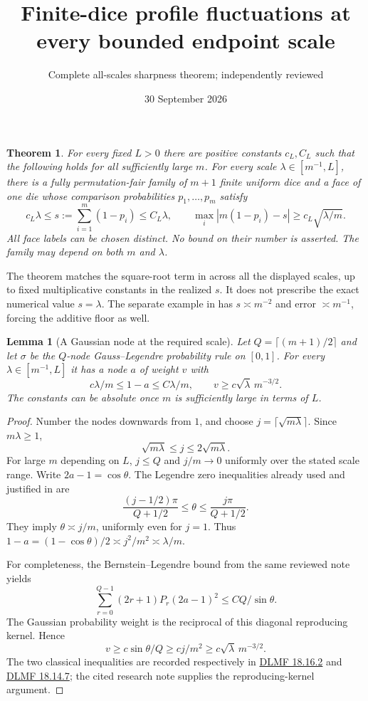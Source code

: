 \documentclass[11pt]{article}
\title{Finite-dice profile fluctuations at every bounded endpoint scale}
\author{Complete all-scales sharpness theorem; independently reviewed}
\date{30 September 2026}
\newtheorem{theorem}{Theorem}\newtheorem{lemma}{Lemma}
\begin{document}
\maketitle

\begin{theorem}\label{main}
For every fixed $L>0$ there are positive constants $c_L,C_L$ such
that the following holds for all sufficiently large $m$.
For every scale $\lambda\in[m^{-1},L]$, there is a fully
permutation-fair family of $m+1$ finite uniform dice and a face of
one die whose comparison probabilities $p_1,\ldots,p_m$ satisfy
\[
 c_L\lambda\le s:=\sum_{i=1}^m(1-p_i)\le C_L\lambda,
 \qquad
 \max_i|m(1-p_i)-s|\ge c_L\sqrt{\lambda/m}.
\]
All face labels can be chosen distinct. No bound on their number is
asserted. The family may depend on both $m$ and $\lambda$.
\end{theorem}

The theorem matches the square-root term in
 across all the displayed
scales, up to fixed multiplicative constants in the realized $s$.
It does not prescribe the exact numerical value $s=\lambda$.
The separate example in 
has $s\asymp m^{-2}$ and error $\asymp m^{-1}$, forcing the
additive floor as well.

\begin{lemma}[A Gaussian node at the required scale]\label{node}
Let $Q=\lceil(m+1)/2\rceil$ and let $\sigma$ be the $Q$-node
Gauss--Legendre probability rule on $[0,1]$. For every
$\lambda\in[m^{-1},L]$ it has a node $a$ of weight $v$ with
\[
 c\lambda/m\le1-a\le C\lambda/m,
 \qquad v\ge c\sqrt\lambda\,m^{-3/2}.
\]
The constants can be absolute once $m$ is sufficiently large in
terms of $L$.
\end{lemma}
\begin{proof}
Number the nodes downwards from $1$, and choose
$j=\lceil\sqrt{m\lambda}\rceil$. Since $m\lambda\ge1$,
\[
 \sqrt{m\lambda}\le j\le2\sqrt{m\lambda}.
\]
For large $m$ depending on $L$, $j\le Q$ and $j/m\to0$
uniformly over the stated scale range. Write $2a-1=\cos\theta$.
The Legendre zero inequalities already used and justified in
 are
\[
 \frac{(j-1/2)\pi}{Q+1/2}\le\theta
       \le\frac{j\pi}{Q+1/2}.
\]
They imply $\theta\asymp j/m$, uniformly even for $j=1$.
Thus $1-a=(1-\cos\theta)/2\asymp j^2/m^2\asymp\lambda/m$.

For completeness, the Bernstein--Legendre bound from the same
reviewed note yields
\[
 \sum_{r=0}^{Q-1}(2r+1)P_r(2a-1)^2
     \le CQ/\sin\theta.
\]
The Gaussian probability weight is the reciprocal of this diagonal
reproducing kernel. Hence
\[
 v\ge c\sin\theta/Q\ge cj/m^2
      \ge c\sqrt\lambda\,m^{-3/2}.
\]
The two classical inequalities are recorded respectively in
\href{https://dlmf.nist.gov/18.16.E2}{DLMF 18.16.2} and
\href{https://dlmf.nist.gov/18.14.E7}{DLMF 18.14.7}; the cited
research note supplies the reproducing-kernel argument.
\end{proof}
\end{document}
